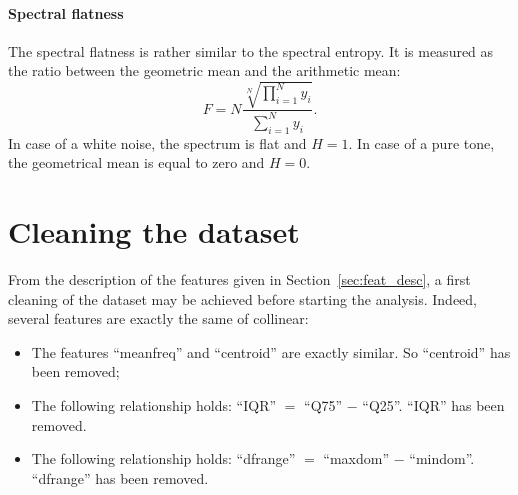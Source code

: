 \paragraph{Spectral flatness}
The spectral flatness is rather similar to the spectral entropy. It is measured as the ratio between the geometric mean and the arithmetic mean:
\begin{equation}
\label{eq:spec_flat}
	F = N \frac{\sqrt[N]{\prod\limits_{i=1}^{N} y_i}}{\sum \limits_{i=1}^{N} y_i}.
\end{equation}
In case of a white noise, the spectrum is flat and $H=1$. In case of a pure tone, the geometrical mean is equal to zero and $H=0$.

\section{Cleaning the dataset}
\label{sec_cleaning_dataset}
From the description of the features given in Section~\ref{sec:feat_desc}, a first cleaning of the dataset may be achieved before starting the analysis.
Indeed, several features are exactly the same of collinear:
\begin{itemize}
	\item The features ``meanfreq'' and ``centroid'' are exactly similar. So ``centroid'' has been removed;
	\item The following relationship holds:  ``IQR'' $=$ ``Q75'' $-$ ``Q25''. ``IQR'' has been removed.
	\item The following relationship holds:  ``dfrange'' $=$ ``maxdom'' $-$ ``mindom''. ``dfrange'' has been removed.
\end{itemize}
%
%
